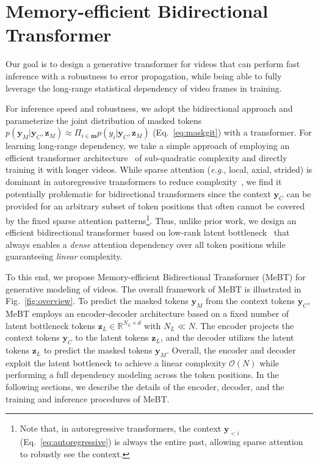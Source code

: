 \documentclass[10pt,twocolumn,letterpaper]{article}
\begin{document}
\section{Memory-efficient Bidirectional Transformer}


\ifdefined{} \fi


Our goal is to design a generative transformer for videos that can perform fast inference with a robustness to error propagation, while being able to fully leverage the long-range statistical dependency of video frames in training.

For inference speed and robustness, we adopt the bidirectional approach and parameterize the joint distribution of masked tokens $p(\mathbf{y}_M|\mathbf{y}_C,\mathbf{z}_M)\approx\Pi_{i\in\mathbf{m}}p(y_i|\mathbf{y}_C,\mathbf{z}_M)$ (Eq.~\eqref{eq:maskgit}) with a transformer.
For learning long-range dependency, we take a simple approach of employing an efficient transformer architecture~\cite{EfficientTransformers} of sub-quadratic complexity and directly training it with longer videos.
While sparse attention (\emph{e.g.}, local, axial, strided) is dominant in autoregressive transformers to reduce complexity~\cite{NUWA, MaskViT, CogVideo, TATS}, we find it potentially problematic for bidirectional transformers since the context $\mathbf{y}_C$ can be provided for an arbitrary subset of token positions that often cannot be covered by the fixed sparse attention patterns\footnote{Note that, in autoregressive transformers, the context $\mathbf{y}_{<i}$ (Eq.~\eqref{eq:autoregressive}) is always the entire past, allowing sparse attention to robustly see the context.}.
Thus, unlike prior work, we design an efficient bidirectional transformer based on low-rank latent bottleneck~\cite{SetTransformer, Linformer, SetVAE, Perceiver, PerceiverIO, LUNA} that always enables a \emph{dense} attention dependency over all token positions while guaranteeing \emph{linear} complexity.



To this end, we propose Memory-efficient Bidirectional Transformer (MeBT) for generative modeling of videos.
The overall framework of MeBT is illustrated in Fig.~\ref{fig:overview}.
To predict the masked tokens $\mathbf{y}_M$ from the context tokens $\mathbf{y}_C$, MeBT employs an encoder-decoder architecture based on a fixed number of latent bottleneck tokens $\mathbf{z}_L\in\mathbb{R}^{N_L\times d}$ with $N_L \ll N$.
The encoder projects the context tokens $\mathbf{y}_C$ to the latent tokens $\mathbf{z}_L$, and the decoder utilizes the latent tokens $\mathbf{z}_L$ to predict the masked tokens $\mathbf{y}_M$.
Overall, the encoder and decoder exploit the latent bottleneck to achieve a linear complexity $\mathcal{O}(N)$ while performing a full dependency modeling across the token positions.
In the following sections, we describe the details of the encoder, decoder, and the training and inference procedures of MeBT.
\end{document}
